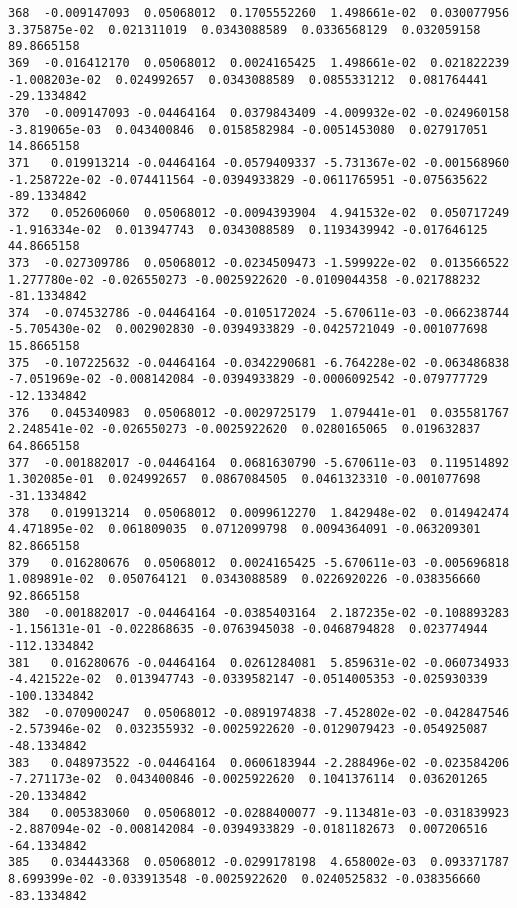 \documentclass[15pt,a4paper,openright]{article}
\begin{document}
\begin{lstlisting}[language=AMPL, caption = data file]
368  -0.009147093  0.05068012  0.1705552260  1.498661e-02  0.030077956  3.375875e-02  0.021311019  0.0343088589  0.0336568129  0.032059158   89.8665158
369  -0.016412170  0.05068012  0.0024165425  1.498661e-02  0.021822239 -1.008203e-02  0.024992657  0.0343088589  0.0855331212  0.081764441  -29.1334842
370  -0.009147093 -0.04464164  0.0379843409 -4.009932e-02 -0.024960158 -3.819065e-03  0.043400846  0.0158582984 -0.0051453080  0.027917051   14.8665158
371   0.019913214 -0.04464164 -0.0579409337 -5.731367e-02 -0.001568960 -1.258722e-02 -0.074411564 -0.0394933829 -0.0611765951 -0.075635622  -89.1334842
372   0.052606060  0.05068012 -0.0094393904  4.941532e-02  0.050717249 -1.916334e-02  0.013947743  0.0343088589  0.1193439942 -0.017646125   44.8665158
373  -0.027309786  0.05068012 -0.0234509473 -1.599922e-02  0.013566522  1.277780e-02 -0.026550273 -0.0025922620 -0.0109044358 -0.021788232  -81.1334842
374  -0.074532786 -0.04464164 -0.0105172024 -5.670611e-03 -0.066238744 -5.705430e-02  0.002902830 -0.0394933829 -0.0425721049 -0.001077698   15.8665158
375  -0.107225632 -0.04464164 -0.0342290681 -6.764228e-02 -0.063486838 -7.051969e-02 -0.008142084 -0.0394933829 -0.0006092542 -0.079777729  -12.1334842
376   0.045340983  0.05068012 -0.0029725179  1.079441e-01  0.035581767  2.248541e-02 -0.026550273 -0.0025922620  0.0280165065  0.019632837   64.8665158
377  -0.001882017 -0.04464164  0.0681630790 -5.670611e-03  0.119514892  1.302085e-01  0.024992657  0.0867084505  0.0461323310 -0.001077698  -31.1334842
378   0.019913214  0.05068012  0.0099612270  1.842948e-02  0.014942474  4.471895e-02  0.061809035  0.0712099798  0.0094364091 -0.063209301   82.8665158
379   0.016280676  0.05068012  0.0024165425 -5.670611e-03 -0.005696818  1.089891e-02  0.050764121  0.0343088589  0.0226920226 -0.038356660   92.8665158
380  -0.001882017 -0.04464164 -0.0385403164  2.187235e-02 -0.108893283 -1.156131e-01 -0.022868635 -0.0763945038 -0.0468794828  0.023774944 -112.1334842
381   0.016280676 -0.04464164  0.0261284081  5.859631e-02 -0.060734933 -4.421522e-02  0.013947743 -0.0339582147 -0.0514005353 -0.025930339 -100.1334842
382  -0.070900247  0.05068012 -0.0891974838 -7.452802e-02 -0.042847546 -2.573946e-02  0.032355932 -0.0025922620 -0.0129079423 -0.054925087  -48.1334842
383   0.048973522 -0.04464164  0.0606183944 -2.288496e-02 -0.023584206 -7.271173e-02  0.043400846 -0.0025922620  0.1041376114  0.036201265  -20.1334842
384   0.005383060  0.05068012 -0.0288400077 -9.113481e-03 -0.031839923 -2.887094e-02 -0.008142084 -0.0394933829 -0.0181182673  0.007206516  -64.1334842
385   0.034443368  0.05068012 -0.0299178198  4.658002e-03  0.093371787  8.699399e-02 -0.033913548 -0.0025922620  0.0240525832 -0.038356660  -83.1334842

\end{lstlisting}
\end{document}
